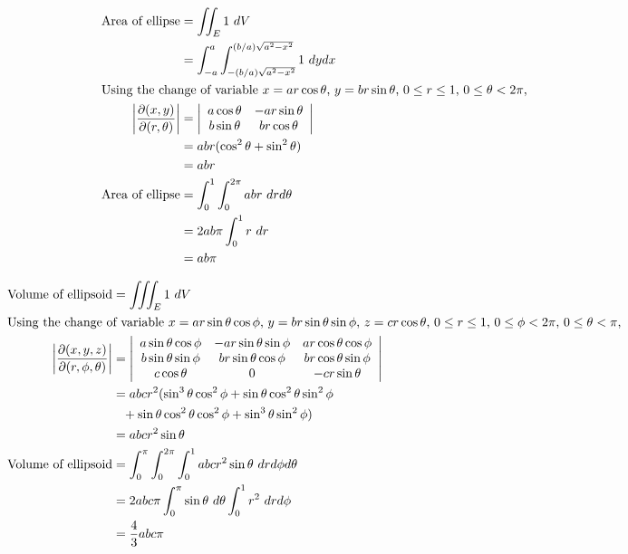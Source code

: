 \documentclass[12pt]{article}
\newenvironment{problem}[2][Problem]{\begin{trivlist}
\item[\hskip \labelsep {\bfseries #1}\hskip \labelsep {\bfseries #2.}]}{\end{trivlist}}
\begin{document}
\begin{problem}{2.a}
\end{problem}
\begin{align*}
	\text{Area of ellipse} &= \iint_{E} 1 \ dV \\
	&= \int_{-a}^a \int_{-(b/a)\sqrt{a^2 - x^2}}^{(b/a)\sqrt{a^2 - x^2}}
		1 
	\ dy dx \\
	\intertext{Using the change of variable $x = ar\cos\theta$, $y = br\sin\theta$,
		$0 \le r \le 1$, $0 \le \theta < 2\pi$,}
	\left| \frac{\partial (x,y)}{\partial (r, \theta)} \right|
	&= \left| \begin{array}{cc}
		a\cos\theta & -ar\sin\theta \\
		b\sin\theta & br\cos\theta \\
	\end{array} \right| \\
	&= abr (\cos^2\theta + \sin^2\theta) \\
	&= abr \\
	\text{Area of ellipse} 
	&= \int_0^1 \int_0^{2\pi}
		abr 
	\ dr d\theta \\
	&= 2ab\pi \int_0^1
		r 
	\ dr \\
	&= ab\pi
\end{align*}
\filbreak

\begin{problem}{2.b}
\end{problem}
\begin{align*}
	\text{Volume of ellipsoid} &= \iiint_{E} 1 \ dV \\
	\intertext{Using the change of variable $x = ar\sin\theta\cos\phi$, $y =
		br\sin\theta\sin\phi$, $z = cr\cos\theta$, $0 \le r \le 1$, $0 \le \phi <
		2\pi$, $0 \le \theta < \pi$,}
	\left| \frac{\partial (x,y,z)}{\partial (r,\phi,\theta)} \right|
	&= \left| \begin{array}{ccc}
		a\sin\theta\cos\phi & -ar\sin\theta\sin\phi & ar\cos\theta\cos\phi \\
		b\sin\theta\sin\phi & br\sin\theta\cos\phi & br\cos\theta\sin\phi \\
		c\cos\theta & 0 & -cr\sin\theta \\
	\end{array} \right| \\
	&= abcr^2(\sin^3\theta\cos^2\phi + \sin\theta\cos^2\theta\sin^2\phi \\
	&\phantom{=} +\sin\theta\cos^2\theta\cos^2\phi + \sin^3\theta\sin^2\phi) \\
	&= abcr^2\sin\theta \\
	\text{Volume of ellipsoid} 
	&= \int_0^\pi \int_0^{2\pi} \int_0^1 
		abcr^2 \sin\theta
	\ dr d\phi d\theta \\
	&= 2abc\pi 
	\int_0^\pi 
		\sin\theta 
	\ d\theta 
	\int_0^1 
		r^2 
	\ dr d\phi \\
	&= \frac{4}{3}abc\pi 
\end{align*}
\end{document}
